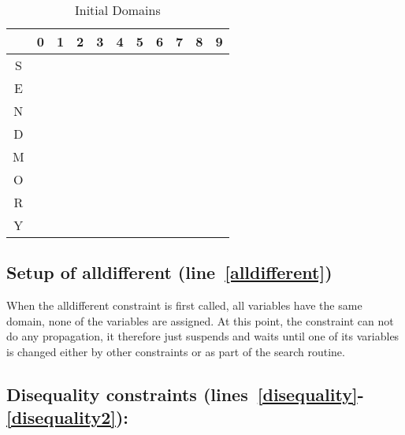 \documentclass[a4paper]{article}
\begin{document}
\begin{table}[htbp]
\begin{center}
\begin{tabular}{|c|c|c|c|c|c|c|c|c|c|c|}\hline
  & 0 & 1 & 2 & 3 & 4 & 5 & 6 & 7 & 8 & 9 \\ \hline
S &   &   &   &   &   &   &   &   &   &   \\ \hline
E &   &   &   &   &   &   &   &   &   &   \\ \hline
N &   &   &   &   &   &   &   &   &   &   \\ \hline
D &   &   &   &   &   &   &   &   &   &   \\ \hline
M &   &   &   &   &   &   &   &   &   &   \\ \hline
O &   &   &   &   &   &   &   &   &   &   \\ \hline
R &   &   &   &   &   &   &   &   &   &   \\ \hline
Y &   &   &   &   &   &   &   &   &   &   \\ \hline
\end{tabular}
\end{center}
\caption{\label{Initial Domains}Initial Domains}
\end{table}

\subsection{Setup of alldifferent (line~\ref{alldifferent})}

When the alldifferent constraint is first called, all variables have the same domain, none of the variables are assigned. At this point, the constraint can not do any propagation, it therefore just suspends and waits until one of its variables is changed either by other constraints or as part of the search routine.


\subsection{Disequality constraints (lines~\ref{disequality}-\ref{disequality2}):}
\end{document}
